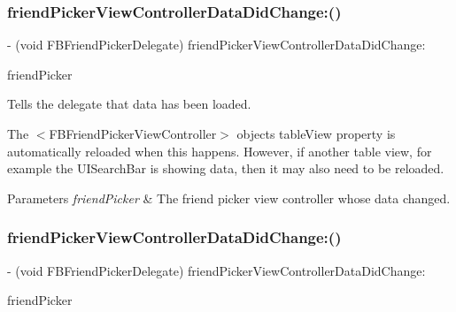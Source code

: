 \subsubsection{\texorpdfstring{friend\+Picker\+View\+Controller\+Data\+Did\+Change\+:()}{friendPickerViewControllerDataDidChange:()}\hspace{0.1cm}{\footnotesize\ttfamily [2/5]}}
{\footnotesize\ttfamily -\/ (void F\+B\+Friend\+Picker\+Delegate) friend\+Picker\+View\+Controller\+Data\+Did\+Change\+: \begin{DoxyParamCaption}\item[{(\hyperlink{interfaceFBFriendPickerViewController}{F\+B\+Friend\+Picker\+View\+Controller} $\ast$)}]{friend\+Picker }\end{DoxyParamCaption}\hspace{0.3cm}{\ttfamily [optional]}}

Tells the delegate that data has been loaded.

The $<$\+F\+B\+Friend\+Picker\+View\+Controller$>$ object\textquotesingle{}s {\ttfamily table\+View} property is automatically reloaded when this happens. However, if another table view, for example the {\ttfamily U\+I\+Search\+Bar} is showing data, then it may also need to be reloaded.


\begin{DoxyParams}{Parameters}
{\em friend\+Picker} & The friend picker view controller whose data changed. \\
\hline
\end{DoxyParams}
\mbox{\label{protocolFBFriendPickerDelegate_01-p_adb573d4fc9792d3dc05298f13bc41086}} 
\subsubsection{\texorpdfstring{friend\+Picker\+View\+Controller\+Data\+Did\+Change\+:()}{friendPickerViewControllerDataDidChange:()}\hspace{0.1cm}{\footnotesize\ttfamily [3/5]}}
{\footnotesize\ttfamily -\/ (void F\+B\+Friend\+Picker\+Delegate) friend\+Picker\+View\+Controller\+Data\+Did\+Change\+: \begin{DoxyParamCaption}\item[{(\hyperlink{interfaceFBFriendPickerViewController}{F\+B\+Friend\+Picker\+View\+Controller} $\ast$)}]{friend\+Picker }\end{DoxyParamCaption}\hspace{0.3cm}{\ttfamily [optional]}}

